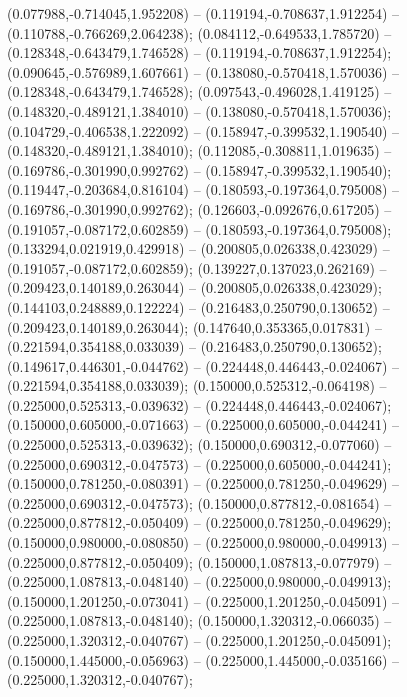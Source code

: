  (0.077988,-0.714045,1.952208) -- (0.119194,-0.708637,1.912254) -- (0.110788,-0.766269,2.064238);
 (0.084112,-0.649533,1.785720) -- (0.128348,-0.643479,1.746528) -- (0.119194,-0.708637,1.912254);
 (0.090645,-0.576989,1.607661) -- (0.138080,-0.570418,1.570036) -- (0.128348,-0.643479,1.746528);
 (0.097543,-0.496028,1.419125) -- (0.148320,-0.489121,1.384010) -- (0.138080,-0.570418,1.570036);
 (0.104729,-0.406538,1.222092) -- (0.158947,-0.399532,1.190540) -- (0.148320,-0.489121,1.384010);
 (0.112085,-0.308811,1.019635) -- (0.169786,-0.301990,0.992762) -- (0.158947,-0.399532,1.190540);
 (0.119447,-0.203684,0.816104) -- (0.180593,-0.197364,0.795008) -- (0.169786,-0.301990,0.992762);
 (0.126603,-0.092676,0.617205) -- (0.191057,-0.087172,0.602859) -- (0.180593,-0.197364,0.795008);
 (0.133294,0.021919,0.429918) -- (0.200805,0.026338,0.423029) -- (0.191057,-0.087172,0.602859);
 (0.139227,0.137023,0.262169) -- (0.209423,0.140189,0.263044) -- (0.200805,0.026338,0.423029);
 (0.144103,0.248889,0.122224) -- (0.216483,0.250790,0.130652) -- (0.209423,0.140189,0.263044);
 (0.147640,0.353365,0.017831) -- (0.221594,0.354188,0.033039) -- (0.216483,0.250790,0.130652);
 (0.149617,0.446301,-0.044762) -- (0.224448,0.446443,-0.024067) -- (0.221594,0.354188,0.033039);
 (0.150000,0.525312,-0.064198) -- (0.225000,0.525313,-0.039632) -- (0.224448,0.446443,-0.024067);
 (0.150000,0.605000,-0.071663) -- (0.225000,0.605000,-0.044241) -- (0.225000,0.525313,-0.039632);
 (0.150000,0.690312,-0.077060) -- (0.225000,0.690312,-0.047573) -- (0.225000,0.605000,-0.044241);
 (0.150000,0.781250,-0.080391) -- (0.225000,0.781250,-0.049629) -- (0.225000,0.690312,-0.047573);
 (0.150000,0.877812,-0.081654) -- (0.225000,0.877812,-0.050409) -- (0.225000,0.781250,-0.049629);
 (0.150000,0.980000,-0.080850) -- (0.225000,0.980000,-0.049913) -- (0.225000,0.877812,-0.050409);
 (0.150000,1.087813,-0.077979) -- (0.225000,1.087813,-0.048140) -- (0.225000,0.980000,-0.049913);
 (0.150000,1.201250,-0.073041) -- (0.225000,1.201250,-0.045091) -- (0.225000,1.087813,-0.048140);
 (0.150000,1.320312,-0.066035) -- (0.225000,1.320312,-0.040767) -- (0.225000,1.201250,-0.045091);
 (0.150000,1.445000,-0.056963) -- (0.225000,1.445000,-0.035166) -- (0.225000,1.320312,-0.040767);
